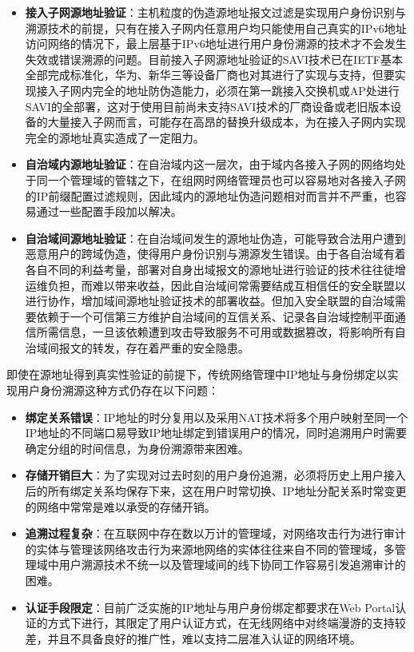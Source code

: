   \begin{itemize}
    \item \textbf{接入子网源地址验证}：主机粒度的伪造源地址报文过滤是实现用户身份识别与溯源技术的前提，只有在接入子网内任意用户均只能使用自己真实的IPv6地址访问网络的情况下，最上层基于IPv6地址进行用户身份溯源的技术才不会发生失效或错误溯源的问题。目前接入子网源地址验证的SAVI技术\cite{RFC6959,RFC7039,RFC6620,RFC7513,RFC7219,I-D.bi-savi-wlan}已在IETF基本全部完成标准化，华为、新华三等设备厂商也对其进行了实现与支持，但要实现接入子网内完全的地址防伪造能力，必须在第一跳接入交换机或AP处进行SAVI的全部署，这对于使用目前尚未支持SAVI技术的厂商设备或老旧版本设备的大量接入子网而言，可能存在高昂的替换升级成本，为在接入子网内实现完全的源地址真实造成了一定阻力。
    \item \textbf{自治域内源地址验证}：在自治域内这一层次，由于域内各接入子网的网络均处于同一个管理域的管辖之下，在组网时网络管理员也可以容易地对各接入子网的IP前缀配置过滤规则，因此域内的源地址伪造问题相对而言并不严重，也容易通过一些配置手段加以解决。
    \item \textbf{自治域间源地址验证}：在自治域间发生的源地址伪造，可能导致合法用户遭到恶意用户的跨域伪造，使得用户身份识别与溯源发生错误。由于各自治域有着各自不同的利益考量，部署对自身出域报文的源地址进行验证的技术往往徒增运维负担，而难以带来收益，因此自治域间常需要结成互相信任的安全联盟以进行协作，增加域间源地址验证技术的部署收益。但加入安全联盟的自治域需要依赖于一个可信第三方维护自治域间的互信关系、记录各自治域控制平面通信所需信息，一旦该依赖遭到攻击导致服务不可用或数据篡改，将影响所有自治域间报文的转发，存在着严重的安全隐患。
  \end{itemize}


  即使在源地址得到真实性验证的前提下，传统网络管理中IP地址与身份绑定以实现用户身份溯源这种方式仍存在以下问题：
  \begin{itemize}
    \item \textbf{绑定关系错误}：IP地址的时分复用以及采用NAT技术将多个用户映射至同一个IP地址的不同端口易导致IP地址绑定到错误用户的情况，同时追溯用户时需要确定分组的时间信息，为身份溯源带来困难。
    \item \textbf{存储开销巨大}：为了实现对过去时刻的用户身份追溯，必须将历史上用户接入后的所有绑定关系均保存下来，这在用户时常切换、IP地址分配关系时常变更的网络中常常是难以承受的存储开销。
    \item \textbf{追溯过程复杂}：在互联网中存在数以万计的管理域，对网络攻击行为进行审计的实体与管理该网络攻击行为来源地网络的实体往往来自不同的管理域，多管理域中用户溯源技术不统一以及管理域间的线下协同工作容易引发追溯审计的困难。
    \item \textbf{认证手段限定}：目前广泛实施的IP地址与用户身份绑定都要求在Web Portal认证的方式下进行，其限定了用户认证方式，在无线网络中对终端漫游的支持较差，并且不具备良好的推广性，难以支持二层准入认证的网络环境。
  \end{itemize}

